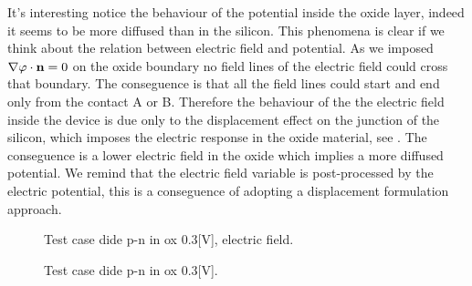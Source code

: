 It's interesting notice the behaviour of the potential inside the oxide layer, indeed it seems to be more diffused than in the silicon. This phenomena is clear if we think about the relation  between electric field and potential.
 As we imposed $\nabla \varphi \cdot \mathbf{n}=0$ on the oxide boundary no field lines of the electric field could cross that boundary. The conseguence is that all the field lines could start and end only from the contact A or B.
Therefore the behaviour of the the electric field inside the device is due only to the displacement effect on the junction of the silicon, which imposes the electric response in the oxide material, see . The conseguence is a lower electric field in the oxide which implies a more diffused potential.
We remind that the electric field variable is post-processed by the electric potential, this is a conseguence of adopting a displacement formulation approach.

\begin{figure}[!t]
\centering
{}
\hspace{1.5cm}
\caption{Test case dide p-n in ox 0.3[V], electric field.}
\label{fig: electric field diode}
\end{figure}

\begin{figure}[!h]
\centering

\hspace{1cm}



\end{figure}




\clearpage


\begin{figure}[!h]
\centering
{}
\hspace{1cm}
\caption{Test case dide p-n in ox 0.3[V].}
\label{fig: potential diodeox}
\end{figure}

